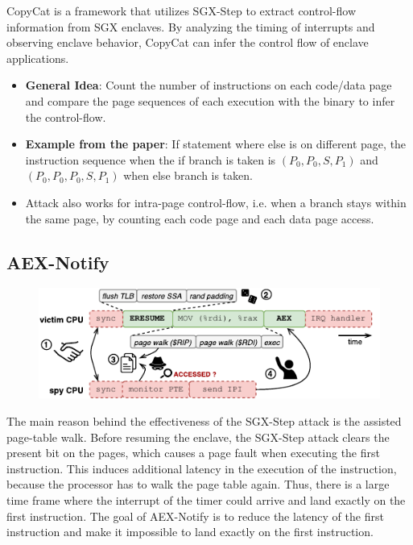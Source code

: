 \documentclass{llncs}
\begin{document}
CopyCat \cite{MoghimiBHPS20} is a framework that utilizes SGX-Step to extract control-flow information from SGX enclaves.
By analyzing the timing of interrupts and observing enclave behavior,
CopyCat can infer the control flow of enclave applications.

\begin{itemize}
  \item \textbf{General Idea}: Count the number of instructions on each code/data page
    and compare the page sequences of each execution with the binary to infer
    the control-flow.
  \item \textbf{Example from the paper}: If statement where else is on different page,
    the instruction sequence when the if branch is taken is $(P_0, P_0, S, P_1)$ and
    $(P_0, P_0, P_0, S, P_1)$ when else branch is taken.
  \item Attack also works for intra-page control-flow, i.e. when a branch stays
    within the same page, by counting each code page and each data page access.
\end{itemize}

\subsection{AEX-Notify}
\label{sec:aex-notify}

\begin{figure}[t]
  \centering
  \includegraphics{images/sgx-step-pte.pdf}
  \caption{}
  \label{fig:sgx-step-pte}
\end{figure}

The main reason behind the effectiveness of the SGX-Step attack is the assisted
page-table walk.
Before resuming the enclave, the SGX-Step attack clears the present bit
on the pages, which causes a page fault when executing the first instruction.
This induces additional latency in the execution of the instruction, because
the processor has to walk the page table again.
Thus, there is a large time frame where the interrupt of the timer could
arrive and land exactly on the first instruction.
The goal of AEX-Notify \cite{ConstableBCXXAK23} is to reduce the latency of the
first instruction and make it impossible to land exactly on the first
instruction.
\end{document}
